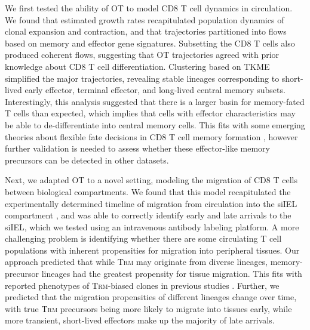 We first tested the ability of OT to model CD8 T cell dynamics in circulation. We found that estimated growth rates recapitulated population dynamics of clonal expansion and contraction, and that trajectories partitioned into flows based on memory and effector gene signatures. Subsetting the CD8 T cells also produced coherent flows, suggesting that OT trajectories agreed with prior knowledge about CD8 T cell differentiation. Clustering based on TKME simplified the major trajectories, revealing stable lineages corresponding to short-lived early effector, terminal effector, and long-lived central memory subsets. Interestingly, this analysis suggested that there is a larger basin for memory-fated T cells than expected, which implies that cells with effector characteristics may be able to de-differentiate into central memory cells. This fits with some emerging theories about flexible fate decisions in CD8 T cell memory formation \citep{abadieReversibleTunableEpigenetic2024}, however further validation is needed to assess whether these effector-like memory precursors can be detected in other datasets.

Next, we adapted OT to a novel setting, modeling the migration of CD8 T cells between biological compartments. We found that this model recapitulated the experimentally determined timeline of migration from circulation into the siIEL compartment \citep{masopustDynamicCellMigration2010}, and was able to correctly identify early and late arrivals to the siIEL, which we tested using an intravenous antibody labeling platform. A more challenging problem is identifying whether there are some circulating T cell populations with inherent propensities for migration into peripheral tissues. Our approach predicted that while T\textsc{rm} may originate from diverse lineages, memory-precursor lineages had the greatest propensity for tissue migration. This fits with reported phenotypes of T\textsc{rm}-biased clones in previous studies \citep{kokPrecursorsCD8Tissue2022,kokCommittedTissueresidentMemory2020}. Further, we predicted that the migration propensities of different lineages change over time, with true T\textsc{rm} precursors being more likely to migrate into tissues early, while more transient, short-lived effectors make up the majority of late arrivals.

